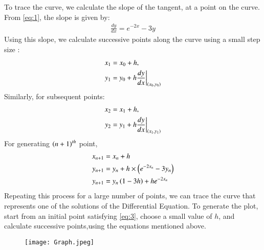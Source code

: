 \documentclass[journal,12pt,onecolumn]{IEEEtran}
\theoremstyle{remark}
\begin{document}
To trace the curve, we calculate the slope of the tangent, at a point  on the curve. From \eqref{eq:1}, the slope is given by:
\begin{align}
\frac{dy}{dx} = e^{-2x} - 3y
\end{align}
Using this slope, we calculate successive points along the curve using a small step size :
\begin{align}
x_1 &= x_0 + h, \\
y_1 &= y_0 + h \frac{dy}{dx}\bigg|_{\left(x_0, y_0\right)}
\end{align}
Similarly, for subsequent points:
\begin{align}
x_2 &= x_1 + h, \\
y_2 &= y_1 + h \frac{dy}{dx}\bigg|_{\left(x_1, y_1\right)}
\end{align}
For generating $\left(n+1\right)^{th}$ point, 
\begin{align}
    x_{n+1}&=x_n + h\\
    y_{n+1}&=y_n + h\times\left(e^{-2x_n} - 3y_n\right) \\
    y_{n+1}&=y_{n}\left(1-3h\right)+he^{-2x_{n}}
\end{align}
Repeating this process for a large number of points, we can trace the curve that represents one of the solutions of the Differential Equation.
To generate the plot, start from an initial point  satisfying \eqref{eq:3}, choose a small value of $h$, and calculate successive points,using the equations mentioned above.

\begin{figure}[h]
    \centering
    \texttt{[image: Graph.jpeg]}
    \label{fig:example}
\end{figure}



   
\end{document}
